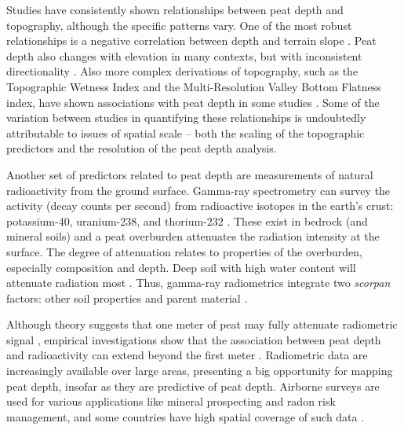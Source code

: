 \documentclass[soil, manuscript]{copernicus}
\begin{document}
Studies have consistently shown relationships between peat depth and topography, although the specific patterns vary.
One of the most robust relationships is a negative correlation between depth and terrain slope \citep[e.g.][]{holdenEstimatingCarbonStock2011, parryMethodModellingPeat2012, gatisMappingUplandPeat2019}.
Peat depth also changes with elevation in many contexts, but with inconsistent directionality \citep[e.g.][]{holdenEstimatingCarbonStock2011, parryMethodModellingPeat2012, rudiyantoDigitalMappingCosteffective2016, rudiyantoOpenDigitalMapping2018, kogantiMappingPeatDepth2023, liFactorsControllingPeat2024}.
Also more complex derivations of topography, such as the Topographic Wetness Index and the Multi-Resolution Valley Bottom Flatness index, have shown associations with peat depth in some studies \citep[e.g.][]{rudiyantoOpenDigitalMapping2018, kogantiMappingPeatDepth2023, liFactorsControllingPeat2024}.
Some of the variation between studies in quantifying these relationships is undoubtedly attributable to issues of spatial scale -- both the scaling of the topographic predictors and the resolution of the peat depth analysis.

Another set of predictors related to peat depth are measurements of natural radioactivity from the ground surface.
Gamma-ray spectrometry can survey the activity (decay counts per second) from radioactive isotopes in the earth's crust: potassium-40, uranium-238, and thorium-232 \citep{reinhardtGammaraySpectrometryVersatile2019}.
These exist in bedrock (and mineral soils) and a peat overburden attenuates the radiation intensity at the surface.
The degree of attenuation relates to properties of the overburden, especially composition and depth.
Deep soil with high water content will attenuate radiation most \citep{beamishGammaRayAttenuation2013, reinhardtGammaraySpectrometryVersatile2019}.
Thus, gamma-ray radiometrics integrate two \emph{scorpan} factors: other soil properties and parent material \citep{mcbratneyDigitalSoilMapping2003}.

Although theory suggests that one meter of peat may fully attenuate radiometric signal \citep{beamishGammaRayAttenuation2013, reinhardtGammaraySpectrometryVersatile2019}, empirical investigations show that the association between peat depth and radioactivity can extend beyond the first meter \citep{keaneySpatialStatisticsEstimate2013, gatisMappingUplandPeat2019, kogantiMappingPeatDepth2023}.
Radiometric data are increasingly available over large areas, presenting a big opportunity for mapping peat depth, insofar as they are predictive of peat depth.
Airborne surveys are used for various applications like mineral prospecting and radon risk management, and some countries have high spatial coverage of such data \citep{minasnyDigitalMappingPeatlands2019, baranwalAirborneGeophysicalSurveys2020}.
\end{document}
